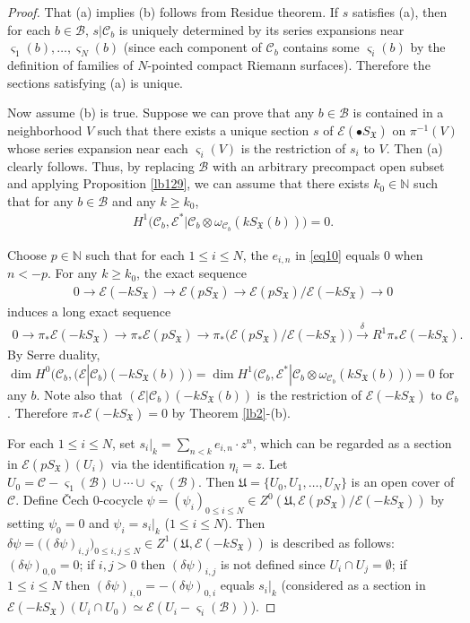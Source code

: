 \documentclass[12pt,a4paper,notitlepage]{report}
\theoremstyle{definition}
\theoremstyle{plain}
\newcommand{\fk}{\mathfrak}
\newcommand{\mc}{\mathcal}
\newcommand{\scr}{\mathscr}
\newcommand{\sgm}{\varsigma}
\newcommand{\SX}{S_{\fk X}}
\newcommand{\mbb}{\mathbb}
\newcommand{\blt}{\bullet}
\numberwithin{equation}{section}
\begin{document}
\begin{proof}
That (a) implies (b) follows from Residue theorem. If $s$ satisfies (a), then for each $b\in\mc B$, $s|\mc C_b$ is uniquely determined by its series expansions near $\sgm_1(b),\dots,\sgm_N(b)$ (since each component of $\mc C_b$ contains some $\sgm_i(b)$ by the definition of families of $N$-pointed compact Riemann surfaces). Therefore the sections satisfying (a) is unique.

Now assume (b) is true.  Suppose we can prove that any $b\in\mc B$ is contained in a neighborhood $V$ such that there exists a unique section $s$ of $\scr E(\blt\SX)$ on $\pi^{-1}(V)$ whose series expansion near each $\sgm_i(V)$ is the restriction of $s_i$ to $V$. Then (a) clearly follows. Thus, by replacing $\mc B$ with an arbitrary precompact open subset and applying Proposition \ref{lb129}, we can assume that there exists $k_0\in\mbb N$ such that for any $b\in\mc B$ and any $k\geq k_0$,
\begin{align*}
H^1\big(\mc C_b,\scr E^*|\mc C_b\otimes\omega_{\mc C_b}(k\SX(b))\big)=0.
\end{align*}

Choose $p\in\mathbb N$ such that for each $1\leq i\leq N$, the $e_{i,n}$ in \eqref{eq10} equals $0$ when $n<-p$. For any $k\geq k_0$, the exact sequence
\begin{align*}
0\rightarrow \scr E(-k\SX)\rightarrow \scr E(p\SX)\rightarrow \scr E(p\SX)/\scr E(-k\SX)\rightarrow 0
\end{align*}
induces a long exact sequence
\begin{align}
0\rightarrow\pi_*\scr E(-k\SX)\rightarrow\pi_*\scr E(p\SX)\rightarrow \pi_*\big(\scr E(p\SX)/\scr E(-k\SX)\big)\xrightarrow{\delta}R^1\pi_*\scr E(-k\SX).\label{eq11}
\end{align}
By Serre duality, $\dim H^0\big(\mc C_b,(\scr E|\mc C_b)(-k\SX(b))\big)=\dim H^1\big(\mc C_b,\scr E^*|\mc C_b\otimes\omega_{\mc C_b}(k\SX(b))\big)=0$ for any $b$. Note also that $(\scr E|\mc C_b)(-k\SX(b))$ is the restriction of $\scr E(-k\SX)$ to $\mc C_b$. Therefore $\pi_*\scr E(-k\SX)=0$ by Theorem \ref{lb2}-(b).

For each $1\leq i\leq N$, set $s_i|_k=\sum_{n<k}e_{i,n}\cdot z^n$, which can be regarded as a section in $\scr E(p\SX)(U_i)$ via the identification $\eta_i=z$. Let $U_0=\mc C-\sgm_1(\mc B)\cup\cdots\cup\sgm_N(\mc B)$. Then $\fk U=\{U_0,U_1,\dots,U_N \}$ is an open cover of $\mc C$. Define \v{C}ech $0$-cocycle $\psi=(\psi_i)_{0\leq i\leq N}\in Z^0(\fk U,\scr E(p\SX)/\scr E(-k\SX))$ by setting $\psi_0=0$ and $\psi_i=s_i|_k$ ($1\leq i\leq N$). Then $\delta\psi=\big((\delta\psi)_{i,j}\big)_{0\leq i,j\leq N}\in Z^1(\fk U,\scr E(-k\SX))$ is described as follows: $(\delta\psi)_{0,0}=0$; if $i,j>0$ then $(\delta\psi)_{i,j}$ is not defined since $U_i\cap U_j=\emptyset$; if $1\leq i\leq N$ then $(\delta\psi)_{i,0}=-(\delta\psi)_{0,i}$ equals $s_i|_k$ (considered as a section in $\scr E(-k\SX)(U_i\cap U_0)\simeq \scr E(U_i-\sgm_i(\mc B))$).


\end{proof}
\end{document}
